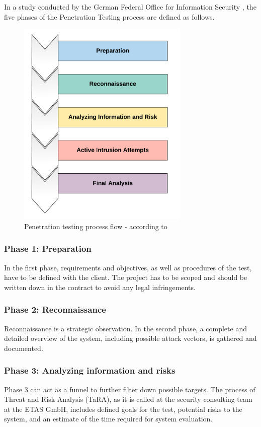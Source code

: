 In a study conducted by the German Federal Office for Information Security \citep{bsiStudy2020}, the five phases of the Penetration Testing process are defined as follows.

\begin{figure}[ht!]
\begin{center}
\includegraphics[height=10cm]{Pentesting_Process.png}
\end{center}
\caption[Penetration testing process flow - according to \citep{bsiStudy2020}]{Penetration testing process flow - according to \citep{bsiStudy2020}}
\end{figure}

\newpage

\subsubsection{Phase 1: Preparation}
In the first phase, requirements and objectives, as well as procedures of the test, have to be defined with the client. The project has to be scoped and should be written down in the contract to avoid any legal infringements.

\subsubsection{Phase 2: Reconnaissance}
Reconnaissance is a strategic observation. In the second phase, a complete and detailed overview of the system, including possible attack vectors, is gathered and documented.

\subsubsection{Phase 3: Analyzing information and risks}
Phase 3 can act as a funnel to further filter down possible targets. The process of Threat and Risk Analysis (TaRA), as it is called at the security consulting team at the ETAS GmbH, includes defined goals for the test, potential risks to the system, and an estimate of the time required for system evaluation. 

